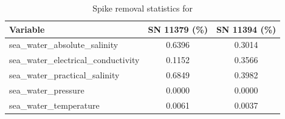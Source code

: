 \begin{table}[h]
\centering
\caption{Spike removal statistics for \projectname{} \casenumber{}}
\label{tab:str21_spike_stats}
\begin{tabular}{|l|c|c|}
\hline
Variable & SN 11379 (\%) & SN 11394 (\%) \\
\hline
sea\_water\_absolute\_salinity & 0.6396 & 0.3014 \\
sea\_water\_electrical\_conductivity & 0.1152 & 0.3566 \\
sea\_water\_practical\_salinity & 0.6849 & 0.3982 \\
sea\_water\_pressure & 0.0000 & 0.0000 \\
sea\_water\_temperature & 0.0061 & 0.0037 \\
\hline
\end{tabular}
\end{table}
